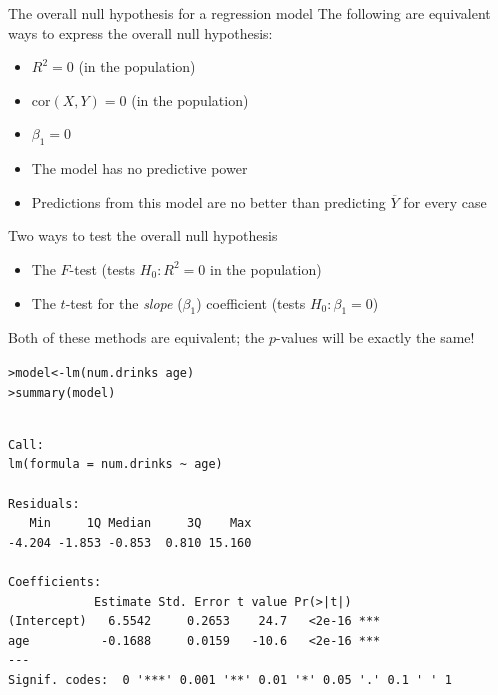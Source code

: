 \documentclass{beamer}\usepackage[]{graphicx}\usepackage[]{color}
\makeatletter
\newcommand{\hlopt}[1]{\textcolor[rgb]{1,0.894,0.769}{#1}}%
\newcommand{\hlstd}[1]{\textcolor[rgb]{1,0.894,0.769}{#1}}%
\newcommand{\hlkwb}[1]{\textcolor[rgb]{0.804,0.776,0.451}{#1}}%
\newcommand{\hlkwd}[1]{\textcolor[rgb]{1,0.78,0.769}{#1}}%
\newenvironment{kframe}{%
 \def\at@end@of@kframe{}%
 \ifinner\ifhmode%
  \def\at@end@of@kframe{\end{minipage}}%
  \begin{minipage}{\columnwidth}%
 \fi\fi%
 \def\FrameCommand##1{\hskip\@totalleftmargin \hskip-\fboxsep
 \colorbox{shadecolor}{##1}\hskip-\fboxsep
     \hskip-\linewidth \hskip-\@totalleftmargin \hskip\columnwidth}%
 \MakeFramed {\advance\hsize-\width
   \@totalleftmargin\z@ \linewidth\hsize
   \@setminipage}}%
 {\par\unskip\endMakeFramed%
 \at@end@of@kframe}
\newenvironment{knitrout}{}{} %
\makeatother
\begin{document}
\begin{darkframes}
    \begin{frame}{The overall null hypothesis for a regression model}
      The following are equivalent ways to express the overall null hypothesis:
      \begin{itemize}[<+->]
        \item $R^2=0$ (in the population)
        \item $\text{cor}(X,Y)=0$ (in the population)
        \item $\beta_1=0$
        \item The model has no predictive power
        \item Predictions from this model are no better than predicting $\overline Y$ for every case
      \end{itemize}
    \end{frame}

    \begin{frame}{Two ways to test the overall null hypothesis}
      \begin{itemize}
        \item The $F$-test (tests $H_0:R^2=0$ in the population)
        \item The $t$-test for the \emph{slope} ($\beta_1$) coefficient (tests $H_0:\beta_1=0$)
      \end{itemize}
      \pause
      Both of these methods are equivalent; the $p$-values will be exactly the same!
    \end{frame}

    \begin{frame}[fragile]
      \fontsize{9}{9}\selectfont
\begin{knitrout}
\begin{kframe}
\begin{alltt}
\hlstd{> }\hlstd{model} \hlkwb{<-} \hlkwd{lm}\hlstd{(num.drinks} \hlopt{~} \hlstd{age)}
\hlstd{> }\hlkwd{summary}\hlstd{(model)}
\end{alltt}
\begin{verbatim}

Call:
lm(formula = num.drinks ~ age)

Residuals:
   Min     1Q Median     3Q    Max 
-4.204 -1.853 -0.853  0.810 15.160 

Coefficients:
            Estimate Std. Error t value Pr(>|t|)    
(Intercept)   6.5542     0.2653    24.7   <2e-16 ***
age          -0.1688     0.0159   -10.6   <2e-16 ***
---
Signif. codes:  0 '***' 0.001 '**' 0.01 '*' 0.05 '.' 0.1 ' ' 1


\end{verbatim}
\end{kframe}
\end{knitrout}
\end{frame}
\end{darkframes}
\end{document}
